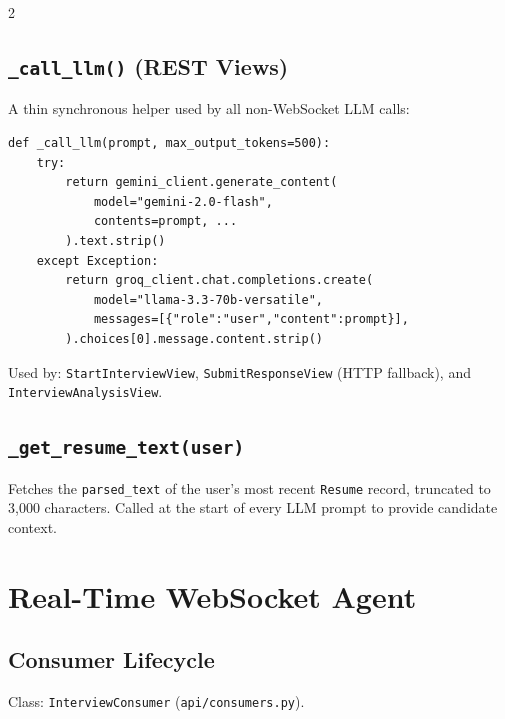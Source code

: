 \documentclass[10pt, a4paper]{article}
\begin{document}
\begin{multicols}{2}
\subsection{\texttt{\_call\_llm()} (REST Views)}
A thin synchronous helper used by all non-WebSocket LLM calls:
\begin{codebox}
\footnotesize
\begin{verbatim}
def _call_llm(prompt, max_output_tokens=500):
    try:
        return gemini_client.generate_content(
            model="gemini-2.0-flash",
            contents=prompt, ...
        ).text.strip()
    except Exception:
        return groq_client.chat.completions.create(
            model="llama-3.3-70b-versatile",
            messages=[{"role":"user","content":prompt}],
        ).choices[0].message.content.strip()
\end{verbatim}
\end{codebox}
Used by: \texttt{StartInterviewView}, \texttt{SubmitResponseView}
(HTTP fallback), and \texttt{InterviewAnalysisView}.

\subsection{\texttt{\_get\_resume\_text(user)}}
Fetches the \texttt{parsed\_text} of the user's most recent
\texttt{Resume} record, truncated to 3,000 characters.
Called at the start of every LLM prompt to provide candidate context.

\section{Real-Time WebSocket Agent}

\subsection{Consumer Lifecycle}
Class: \texttt{InterviewConsumer}
(\texttt{api/consumers.py}).


\end{multicols}
\end{document}
